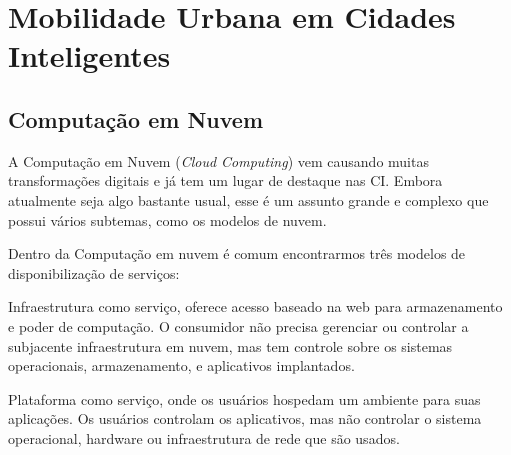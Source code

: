 %
%

\chapter{Mobilidade Urbana em Cidades Inteligentes}\label{chap:Mobilidade Urbana em Cidades Inteligentes} %

\section{Computação em Nuvem}
A Computação em Nuvem (\textit{Cloud Computing}) vem causando muitas transformações digitais e já tem um lugar de destaque nas CI. Embora atualmente seja algo bastante usual, esse é um assunto grande e complexo que possui vários subtemas, como os modelos de nuvem.

Dentro da Computação em nuvem é comum encontrarmos três modelos de disponibilização de serviços: 

Infraestrutura como serviço, oferece acesso baseado na web para armazenamento e poder de computação. O consumidor não precisa gerenciar ou controlar a subjacente infraestrutura em nuvem, mas tem controle sobre os sistemas operacionais, armazenamento, e aplicativos implantados.

Plataforma como serviço, onde os usuários hospedam um
ambiente para suas aplicações. Os usuários controlam os aplicativos, mas não controlar o sistema operacional, hardware ou infraestrutura de rede que são usados.

